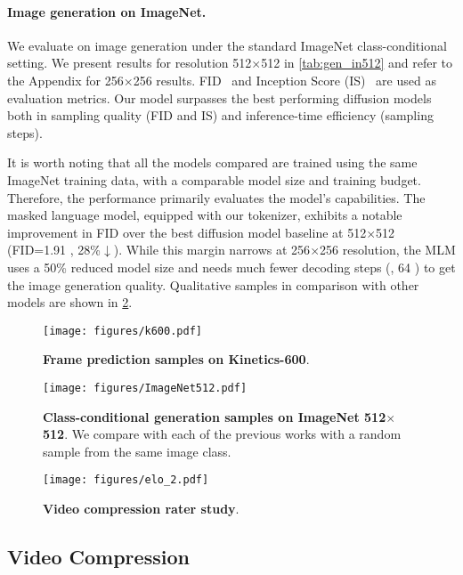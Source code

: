 \paragraph{Image generation on ImageNet.}
We evaluate \modelname{} on image generation under the standard ImageNet class-conditional setting.
We present results for resolution 512$\times$512 in \cref{tab:gen_in512} and refer to the Appendix for 256$\times$256 results. FID~\citep{heusel2017gans} and Inception Score (IS)~\citep{salimans2016improved} are used as evaluation metrics. Our model surpasses the best performing diffusion models both in sampling quality (FID and IS) and inference-time efficiency (sampling steps). 

It is worth noting that all the models compared are trained using the same ImageNet training data, with a comparable model size and training budget. Therefore, the performance primarily evaluates the model's capabilities. The masked language model, equipped with our tokenizer, exhibits a notable improvement in FID over the best diffusion model baseline at 512$\times$512 (FID=1.91 , 28\%$\downarrow$). While this margin narrows at 256$\times$256 resolution, the MLM uses a 50\% reduced model size and needs much fewer decoding steps (\eg, 64 ) to get the image generation quality.
Qualitative samples in comparison with other models are shown in \cref{fig:imagenet}.

\begin{figure}[tp]
\vspace{-4mm}
    \centering
    \texttt{[image: figures/k600.pdf]}
    \vspace{-7mm}
    \caption{\textbf{Frame prediction samples on Kinetics-600}.}
    \label{fig:k600}
    \vspace{-2mm}
\end{figure}
\begin{figure}[tp]
    \centering
    \texttt{[image: figures/ImageNet512.pdf]}
    \vspace{-7mm}
    \caption{\textbf{Class-conditional generation samples on ImageNet 512$\times$512}. We compare with each of the previous works with a random sample from the same image class.}
    \label{fig:imagenet}
    \vspace{-6mm}
\end{figure}

\setlength\intextsep{20pt}
\begin{wrapfigure}{r}{0.45\textwidth}
\vspace{-2mm}
    \centering
    \texttt{[image: figures/elo\_2.pdf]}
    \vspace{-6mm}
    \caption{\textbf{Video compression rater study}.
    }
    \label{fig:compression}
    \vspace{-28mm}
\end{wrapfigure}
\vspace{-8mm}
\leavevmode\subsection{Video Compression}

